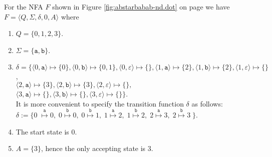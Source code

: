 \exampleEng
For the \textsc{NFA} $F$ shown in Figure \ref{fig:abstarbabab-nd.dot} on page \pageref{fig:abstarbabab-nd.dot} 
we have
\\[0.2cm]
\hspace*{1.3cm}
$F = \langle Q, \Sigma, \delta, 0, A\rangle$ \quad where
\begin{enumerate}
\item $Q = \{ 0, 1, 2, 3 \}$.
\item $\Sigma = \{ \texttt{a}, \texttt{b} \}$.
\item $\delta = \bigl\{ 
       \langle 0, \texttt{a}  \rangle \mapsto \{ 0 \},
       \langle 0, \texttt{b}  \rangle \mapsto \{ 0, 1 \},
       \langle 0, \varepsilon \rangle \mapsto \{ \},
       \langle 1, \texttt{a}  \rangle \mapsto \{ 2 \},
       \langle 1, \texttt{b}  \rangle \mapsto \{ 2 \},
       \langle 1, \varepsilon \rangle \mapsto \{  \}$,
      \\[0.2cm]
      \hspace*{0.74cm}
      $\langle 2, \texttt{a}  \rangle \mapsto \{ 3 \},
       \langle 2, \texttt{b}  \rangle \mapsto \{ 3 \}, 
       \langle 2, \varepsilon \rangle \mapsto \{ \},$
      \\[0.2cm]
      \hspace*{0.74cm}
      $\langle 3, \texttt{a}  \rangle \mapsto \{\},
       \langle 3, \texttt{b}  \rangle \mapsto \{\}, 
       \langle 3, \varepsilon \rangle \mapsto \{\}\bigr\}$.
      \\[0.2cm]
      It is more convenient to specify the transition function $\delta$ as follows:
      \\[0.2cm]
      \hspace*{1.3cm}
       $\delta := \bigl\{0\;  \stackrel{\texttt{a}}{\mapsto} 0,\;
        0 \stackrel{\texttt{b}}{\mapsto} 0,\;
        0 \stackrel{\texttt{b}}{\mapsto} 1,\;
        1 \stackrel{\texttt{a}}{\mapsto} 2,\;
        1 \stackrel{\texttt{b}}{\mapsto} 2,\;
        2 \stackrel{\texttt{a}}{\mapsto} 3,\;
       2 \stackrel{\texttt{b}}{\mapsto} 3\;\bigr\}$.
\item The start state is $0$.
\item $A = \{ 3 \}$, hence the only accepting state is $3$. \eox
\end{enumerate}
\vspace*{0.3cm}

